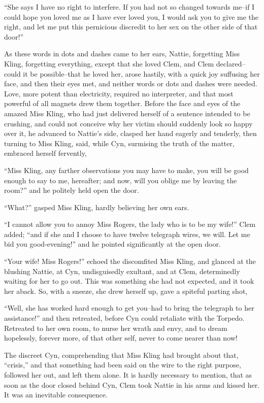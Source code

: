 ``She says I have no right to interfere. If you had not so changed
towards me--if I could hope you loved me as I have ever loved you, I
would ask you to give me the right, and let me put this pernicious
discredit to her sex on the other side of that door!''

As these words in dots and dashes came to her ears, Nattie, forgetting
Miss Kling, forgetting everything, except that she loved Clem, and Clem
declared--could it be possible--that he loved her, arose hastily, with a
quick joy suffusing her face, and then their eyes met, and neither words
or dots and dashes were needed. Love, more potent than electricity,
required no interpreter, and that most powerful of all magnets drew them
together. Before the face and eyes of the amazed Miss Kling, who had
just delivered herself of a sentence intended to be crushing, and could
not conceive why her victim should suddenly look so happy over it, he
advanced to Nattie's side, clasped her hand eagerly and tenderly, then
turning to Miss Kling, said, while Cyn, surmising the truth of the
matter, embraced herself fervently,

``Miss Kling, any farther observations you may have to make, you will be
good enough to say to me, hereafter; and now, will you oblige me by
leaving the room?'' and he politely held open the door.

``What?'' gasped Miss Kling, hardly believing her own ears.

``I cannot allow you to annoy Miss Rogers, the lady who is to be my
wife!'' Clem added; ``and if she and I choose to have twelve telegraph
wires, we will. Let me bid you good-evening!'' and he pointed
significantly at the open door.

``Your wife! Miss Rogers!'' echoed the discomfited Miss Kling, and glanced
at the blushing Nattie, at Cyn, undisguisedly exultant, and at Clem,
determinedly waiting for her to go out. This was something she had not
expected, and it took her aback. So, with a sneeze, she drew herself up,
gave a spiteful parting shot,

``Well, she has worked hard enough to get you--had to bring the telegraph
to her assistance!'' and then retreated, before Cyn could retaliate with
the Torpedo. Retreated to her own room, to nurse her wrath and envy, and
to dream hopelessly, forever more, of that other self, never to come
nearer than now!

The discreet Cyn, comprehending that Miss Kling had brought about that,
``crisis,'' and that something had been said on the wire to the right
purpose, followed her out, and left them alone. It is hardly necessary
to mention, that as soon as the door closed behind Cyn, Clem took Nattie
in his arms and kissed her. It was an inevitable consequence.


